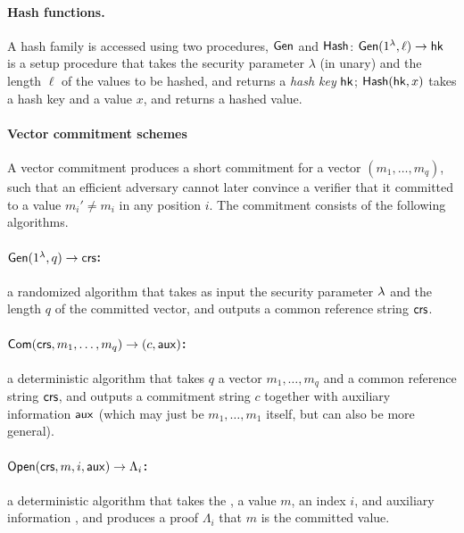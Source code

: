 \paragraph{Hash functions.}
A hash family is accessed using two procedures, $\mathsf{Gen}$ and $\mathsf{Hash}$:
$\mathsf{Gen}(1^\lambda, \ell)\rightarrow \mathsf{hk}$ is a setup procedure that takes the security parameter $\lambda$
(in unary) and the length $\ell$ of the values to be hashed, and returns a \emph{hash key} $\mathsf{hk}$;
$\mathsf{Hash}(\mathsf{hk}, x)$ takes a hash key and a value $x$, and returns a hashed value.

\paragraph{Vector commitment schemes}
A vector commitment produces a short commitment for a vector $(m_1,\ldots,m_q)$,
such that an efficient adversary cannot later convince a verifier that it committed to a value $m_i' \neq m_i$
in any position $i$.
The commitment
consists of the following algorithms.

\vspace{-1ex}
\paragraph{$\mathsf{Gen}(1^\lambda, q)\to \mathsf{crs}$:} a randomized algorithm that takes as input the security parameter $\lambda$ and the length $q$ of the committed vector, and outputs a common reference string $\mathsf{crs}$.
\vspace{-1ex}
\paragraph{$\mathsf{Com}(\mathsf{crs}, m_1,\ldots , m_q)\to (c,\mathsf{aux})$:} a deterministic algorithm that takes $q$ 
a vector $m_1,\ldots, m_q$ and a common reference string $\mathsf{crs}$, and outputs a commitment string $c$ together with auxiliary information $\mathsf{aux}$
(which may just be $m_1,\ldots,m_1$ itself, but can also be more general).
\vspace{-1ex}
\paragraph{$\mathsf{Open}(\mathsf{crs}, m, i, \mathsf{aux})\to \Lambda_i$:} a deterministic algorithm that takes the \crs, a value $m$, an index $i$, and auxiliary information \aux,
and produces a proof $\Lambda_i$ that $m$ is the \ith committed value.
\vspace{-1ex}
